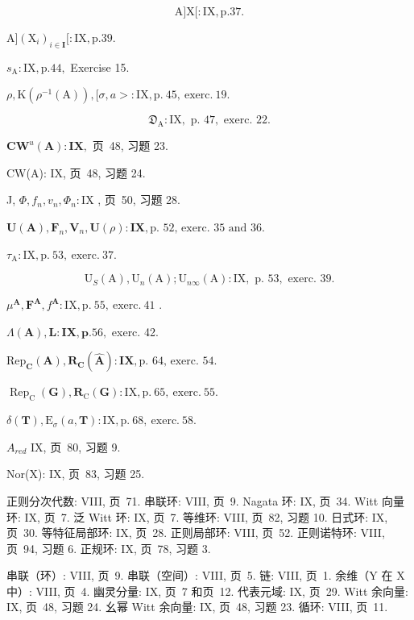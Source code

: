 \[
\mathrm{A} ] \mathrm{X} [: \mathrm{IX}, \mathrm{p}. 37.
\]

\(\mathrm{A}]\left(\mathrm{X}_{i}\right)_{i\in \mathbf{I}}[: \mathrm{IX},\mathrm{p.}39.\)

\(s_{\mathrm{A}}:\mathrm{IX},\mathrm{p.}44,\) Exercise 15.

\(\rho,\mathrm{K}(\rho^{-1}(\mathrm{A})),[\sigma,a>:\mathrm{IX},\mathrm{p.~45,~exerc.~19}.\)

\[
\mathfrak {D} _ {\mathrm{A}}: \mathrm{IX}, \text { p. } 47, \text { exerc. } 22.
\]

\(\mathbf{CW}^u (\mathbf{A}):\mathbf{IX},\) 页~48, 习题 23.

CW(A): IX, 页~48, 习题 24.

J, \(\Phi, f_n, v_n, \Phi_n: \mathrm{IX}\) , 页~50, 习题 28.

\(\mathbf{U}(\mathbf{A}), \mathbf{F}_n, \mathbf{V}_n, \mathbf{U}(\rho) : \mathbf{IX}, \text{p. 52, exerc. 35 and 36.}\)

\(\tau_{\mathrm{A}}:\mathrm{IX},\mathrm{p.~53,~exerc.~37.}\)

\[
\mathrm{U} _ {S} (\mathrm{A}), \mathrm{U} _ {n} (\mathrm{A}); \mathrm{U} _ {n \infty} (\mathrm{A}): \mathrm{IX}, \text { p. } 53, \text { exerc. } 39.
\]

\(\mu^{\mathbf{A}}, \mathbf{F}^{\mathbf{A}}, f^{\mathbf{A}}: \mathrm{IX}, \mathrm{p.~55,~exerc.~41}\) .

\(\Lambda (\mathbf{A}),\mathbf{L}:\mathbf{IX},\mathbf{p}.56,\) exerc. 42.

\(\mathrm{Rep}_{\mathbf{C}}(\mathbf{A}), \mathbf{R}_{\mathbf{C}}(\mathbf{\hat{A}}) : \mathbf{IX}, \text{p. 64, exerc. 54.}\)

\(\operatorname{Rep}_{\mathrm{C}}(\mathbf{G}), \mathbf{R}_{\mathrm{C}}(\mathbf{G}) : \mathrm{IX}, \mathrm{p.~65,~exerc.~55}.\)

\(\delta (\mathbf{T}),\mathrm{E}_{\sigma}(a,\mathbf{T}):\mathrm{IX},\mathrm{p.~68,~exerc.~58.}\)

\(A_{red}\) IX, 页~80, 习题 9.

Nor(X): IX, 页~83, 习题 25.


正则分次代数: VIII, 页~71. 串联环: VIII, 页~9. Nagata 环: IX, 页~34. Witt 向量环: IX, 页~7. 泛 Witt 环: IX, 页~7. 等维环: VIII, 页~82, 习题 10. 日式环: IX, 页~30. 等特征局部环: IX, 页~28. 正则局部环: VIII, 页~52. 正则诺特环: VIII, 页~94, 习题 6. 正规环: IX, 页~78, 习题 3.

串联（环）: VIII, 页~9. 串联（空间）: VIII, 页~5. 链: VIII, 页~1. 余维（Y 在 X 中）: VIII, 页~4. 幽灵分量: IX, 页~7 和页~12. 代表元域: IX, 页~29. Witt 余向量: IX, 页~48, 习题 24. 幺幂 Witt 余向量: IX, 页~48, 习题 23. 循环: VIII, 页~11.

